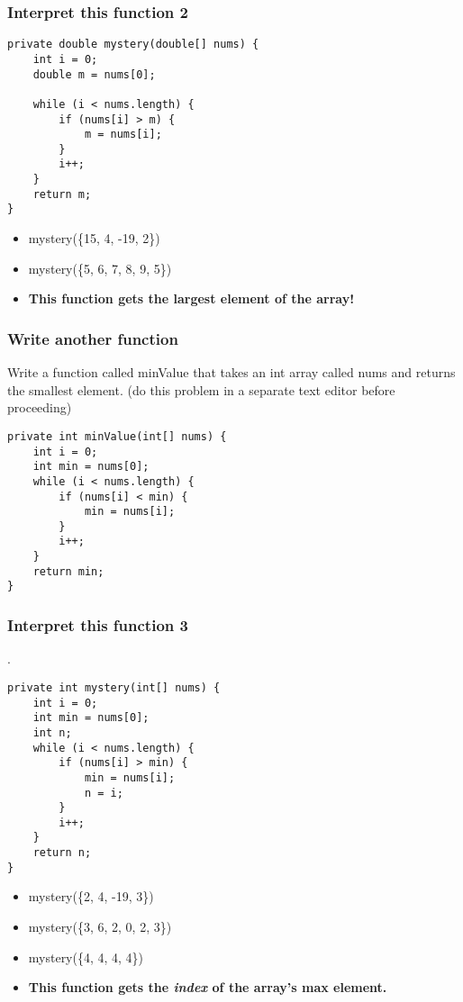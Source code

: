 \documentclass{beamer}
\begin{document}
\begin{frame}[fragile]
\frametitle{Interpret this function 2}
\begin{lstlisting}
private double mystery(double[] nums) {
    int i = 0;
    double m = nums[0];
    
    while (i < nums.length) {
        if (nums[i] > m) {
            m = nums[i];
        }
        i++;
    }
    return m;
}
\end{lstlisting}
\begin{itemize}
\item<2-> mystery(\{15, 4, -19, 2\})
\item<3-> mystery(\{5, 6, 7, 8, 9, 5\})
\item<4-> \textbf{This function gets the largest element of the array!}
\end{itemize}
\end{frame}

\begin{frame}[fragile]
\frametitle{Write another function}
Write a function called minValue that takes an int array called nums and returns the smallest element.
\pause
(do this problem in a separate text editor before proceeding)
\pause
\begin{lstlisting}
private int minValue(int[] nums) {
    int i = 0;
    int min = nums[0];
    while (i < nums.length) {
        if (nums[i] < min) {
            min = nums[i];
        }
        i++;
    }
    return min;
}
\end{lstlisting}
\end{frame}

\begin{frame}[fragile]
\frametitle{Interpret this function 3}
.
\begin{lstlisting}
private int mystery(int[] nums) {
    int i = 0;
    int min = nums[0];
    int n;
    while (i < nums.length) {
        if (nums[i] > min) {
            min = nums[i];
            n = i;
        }
        i++;
    }
    return n;
}
\end{lstlisting}
\begin{itemize}
\item<2-> mystery(\{2, 4, -19, 3\})
\item<3-> mystery(\{3, 6, 2, 0, 2, 3\})
\item<4-> mystery(\{4, 4, 4, 4\})
\item<5-> \textbf{This function gets the \textit{index} of the array's max element.}
\end{itemize}
\end{frame}
\end{document}
